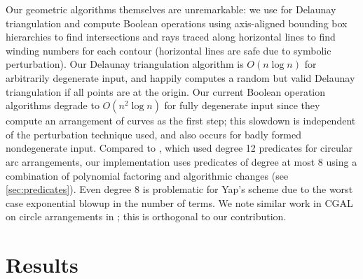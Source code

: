 \documentclass[11pt]{article}
\begin{document}
Our geometric algorithms themselves are unremarkable: we use \cite{amenta2003incremental} for Delaunay triangulation and compute Boolean operations using axis-aligned bounding
box hierarchies to find intersections and rays traced along horizontal lines to find winding numbers for each contour (horizontal lines are safe due to symbolic perturbation).  Our Delaunay
triangulation algorithm is $O(n \log n)$ for arbitrarily degenerate input, and happily computes a random but valid Delaunay triangulation if all points are at the origin.  Our current Boolean
operation algorithms degrade to $O(n^2 \log n)$ for fully degenerate input since they compute an arrangement of curves as the first step; this slowdown is independent of the perturbation
technique used, and also occurs for badly formed nondegenerate input.  Compared to \cite{devillers2000algebraic}, which used degree 12 predicates for circular arc arrangements,
our implementation uses predicates of degree at most 8 using a combination of polynomial factoring and algorithmic changes (see \autoref{sec:predicates}).  Even degree 8 is problematic
for Yap's scheme due to the worst case exponential blowup in the number of terms.  We note similar work in CGAL on circle arrangements in \cite{wein2006circles}; this is orthogonal to our contribution.

\section{Results} \label{sec:results}
\end{document}
